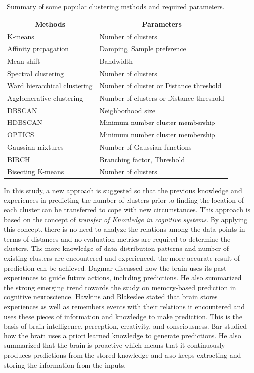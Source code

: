 \documentclass[lettersize,journal]{IEEEtran}
\begin{document}
\begin{table}
\label{cluster-method-parameter}
\caption{Summary of some popular clustering methods and required parameters.}
\begin{tabular}{|l|l|} \hline
\multicolumn{1}{|c|}{Methods} & \multicolumn{1}{c|}{Parameters} \\ \hline
K-means & Number of clusters \\
Affinity propagation & Damping, Sample preference \\
Mean shift & Bandwidth \\
Spectral clustering & Number of clusters \\
Ward hierarchical clustering & Number of cluster or Distance threshold \\
Agglomerative clustering & Number of clusters or Distance threshold \\
DBSCAN & Neighborhood size \\
HDBSCAN & Minimum number cluster membership \\
OPTICS & Minimum number cluster membership \\
Gaussian mixtures & Number of Gaussian functions \\
BIRCH & Branching factor, Threshold \\
Bisecting K-means & Number of clusters \\ \hline
\end{tabular}
\end{table}

\IEEEpubidadjcol
In this study, a new approach is suggested so that the previous knowledge and experiences in predicting
the number of clusters prior to finding the location of each cluster can be transferred to cope with
new circumstances. This approach is based on the concept of {\em transfer of Knowledge
in cognitive systems}. By applying this concept, there is no need to analyze the relations among the 
data points in terms of distances and no evaluation metrics are required to determine the clusters.
The more knowledge of data distribution patterns and number of existing clusters are encountered
and experienced, the more accurate result of prediction can be achieved. Dagmar \cite{Dagmar} discussed
how the brain uses its past experiences to guide future actions, including predictions. He also
summarized the strong emerging trend towards
the study on memory-based prediction in cognitive neuroscience. Hawkins and Blakeslee 
\cite{Hawkins} stated that brain stores experiences as well as remembers events with their relations 
it encountered and uses these pieces of information and knowledge to make prediction. This is the
basis of brain intelligence, perception, creativity, and consciousness. Bar \cite{Bar} studied how 
the brain uses a priori learned knowledge to generate predictions. He also summarized that the brain is
proactive which means that it continuously produces predictions from the stored knowledge and also
keeps extracting and storing the information from the inputs.
\end{document}
